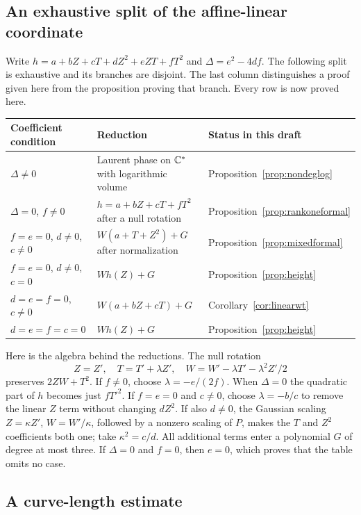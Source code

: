 \subsection{An exhaustive split of the affine-linear coordinate}\label{sec:wsplit}

Write $h=a+bZ+cT+dZ^2+eZT+fT^2$ and
$\Delta=e^2-4df$. The following split is exhaustive and its branches
are disjoint. The last column distinguishes a proof given here from
the proposition proving that branch. Every row is now proved here.

\begin{center}\small
\begin{tabular}{@{}p{}p{}p{}@{}}
\toprule
Coefficient condition & Reduction & Status in this draft\\
\midrule
$\Delta\ne0$ & Laurent phase on $\mathbb C^*$ with logarithmic volume &
Proposition~\ref{prop:nondeglog}\\[3pt]
$\Delta=0$, $f\ne0$ & $h=a+bZ+cT+fT^2$ after a null rotation &
Proposition~\ref{prop:rankoneformal}\\[3pt]
$f=e=0$, $d\ne0$, $c\ne0$ &
$W(a+T+Z^2)+G$ after normalization &
Proposition~\ref{prop:mixedformal}\\[3pt]
$f=e=0$, $d\ne0$, $c=0$ & $Wh(Z)+G$ &
Proposition~\ref{prop:height}\\[3pt]
$d=e=f=0$, $c\ne0$ & $W(a+bZ+cT)+G$ &
Corollary~\ref{cor:linearwt}\\[3pt]
$d=e=f=c=0$ & $Wh(Z)+G$ &
Proposition~\ref{prop:height}\\
\bottomrule
\end{tabular}
\end{center}

Here is the algebra behind the reductions. The null rotation
\[
 Z=Z',\quad T=T'+\lambda Z',\quad
 W=W'-\lambda T'-\lambda^2Z'/2
\]
preserves $2ZW+T^2$. If $f\ne0$, choose $\lambda=-e/(2f)$.
When $\Delta=0$ the quadratic part of $h$ becomes just $fT'^2$.
If $f=e=0$ and $c\ne0$, choose $\lambda=-b/c$ to remove the
linear $Z$ term without changing $dZ^2$. If also $d\ne0$, the
Gaussian scaling $Z=\kappa Z'$, $W=W'/\kappa$, followed by a
nonzero scaling of $P$, makes the $T$ and $Z^2$ coefficients both
one; take $\kappa^2=c/d$. All additional terms enter a polynomial
$G$ of degree at most three. If $\Delta=0$ and $f=0$, then $e=0$,
which proves that the table omits no case.

\subsection{A curve-length estimate}

